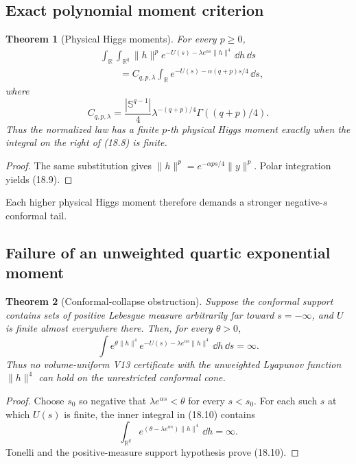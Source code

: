 \documentclass[11pt]{article}
\newtheorem{theorem}{Theorem}[section]
\theoremstyle{remark}
\begin{document}
\subsection{Exact polynomial moment criterion}

\begin{theorem}[Physical Higgs moments]
\label{thm:v17v18-polynomial-moments}
For every \(p\geq0\),
\[
\begin{aligned}
 &\int_{\mathbb R}\int_{\mathbb R^q}
 \|h\|^p
 e^{-U(s)-\lambda e^{\alpha s}\|h\|^4}\,\dd h\,\dd s\\
 &\qquad =
 C_{q,p,\lambda}
 \int_{\mathbb R}
 e^{-U(s)-\alpha(q+p)s/4}\,\dd s,                 \tag{18.8}
\end{aligned}
\]
where
\[
 C_{q,p,\lambda}
 =\frac{|\mathbb S^{q-1}|}{4}
 \lambda^{-(q+p)/4}\Gamma((q+p)/4).               \tag{18.9}
\]
Thus the normalized law has a finite \(p\)-th physical Higgs
moment exactly when the integral on the right of (18.8) is finite.
\end{theorem}

\begin{proof}
The same substitution gives
\(\|h\|^p=e^{-\alpha ps/4}\|y\|^p\).  Polar integration yields
(18.9).
\end{proof}

Each higher physical Higgs moment therefore demands a stronger
negative-\(s\) conformal tail.

\subsection{Failure of an unweighted quartic exponential moment}

\begin{theorem}[Conformal-collapse obstruction]
\label{thm:v17v18-collapse}
Suppose the conformal support contains sets of positive Lebesgue
measure arbitrarily far toward \(s=-\infty\), and \(U\) is finite
almost everywhere there.  Then, for every \(\theta>0\),
\[
 \int e^{\theta\|h\|^4}
 e^{-U(s)-\lambda e^{\alpha s}\|h\|^4}
 \,\dd h\,\dd s=\infty.                            \tag{18.10}
\]
Thus no volume-uniform V13 certificate with the unweighted
Lyapunov function \(\|h\|^4\) can hold on the unrestricted
conformal cone.
\end{theorem}

\begin{proof}
Choose \(s_0\) so negative that
\(\lambda e^{\alpha s}<\theta\) for every \(s<s_0\).
For each such \(s\) at which \(U(s)\) is finite, the inner integral
in (18.10) contains
\[
 \int_{\mathbb R^q}
 e^{(\theta-\lambda e^{\alpha s})\|h\|^4}\,\dd h
 =\infty.
\]
Tonelli and the positive-measure support hypothesis prove (18.10).
\end{proof}
\end{document}
